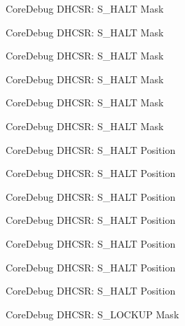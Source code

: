 \begin{DoxyRefList}
\label{deprecated__deprecated000118}%
%
Core\+Debug D\+H\+C\+SR\+: S\+\_\+\+H\+A\+LT Mask 

\label{deprecated__deprecated000172}%
%
Core\+Debug D\+H\+C\+SR\+: S\+\_\+\+H\+A\+LT Mask 

\label{deprecated__deprecated000257}%
%
Core\+Debug D\+H\+C\+SR\+: S\+\_\+\+H\+A\+LT Mask 

\label{deprecated__deprecated000314}%
%
Core\+Debug D\+H\+C\+SR\+: S\+\_\+\+H\+A\+LT Mask 

\label{deprecated__deprecated000390}%
%
Core\+Debug D\+H\+C\+SR\+: S\+\_\+\+H\+A\+LT Mask 

\label{deprecated__deprecated000477}%
%
Core\+Debug D\+H\+C\+SR\+: S\+\_\+\+H\+A\+LT Mask  
\item[Member \mbox{\hyperlink{group__CMSIS__CoreDebug_ga760a9a0d7f39951dc3f07d01f1f64772}{Core\+Debug\+\_\+\+D\+H\+C\+S\+R\+\_\+\+S\+\_\+\+H\+A\+L\+T\+\_\+\+Pos}} ]\label{deprecated__deprecated000025}%
%
Core\+Debug D\+H\+C\+SR\+: S\+\_\+\+H\+A\+LT Position 

\label{deprecated__deprecated000117}%
%
Core\+Debug D\+H\+C\+SR\+: S\+\_\+\+H\+A\+LT Position 

\label{deprecated__deprecated000171}%
%
Core\+Debug D\+H\+C\+SR\+: S\+\_\+\+H\+A\+LT Position 

\label{deprecated__deprecated000256}%
%
Core\+Debug D\+H\+C\+SR\+: S\+\_\+\+H\+A\+LT Position 

\label{deprecated__deprecated000313}%
%
Core\+Debug D\+H\+C\+SR\+: S\+\_\+\+H\+A\+LT Position 

\label{deprecated__deprecated000389}%
%
Core\+Debug D\+H\+C\+SR\+: S\+\_\+\+H\+A\+LT Position 

\label{deprecated__deprecated000476}%
%
Core\+Debug D\+H\+C\+SR\+: S\+\_\+\+H\+A\+LT Position  
\item[Member \mbox{\hyperlink{group__CMSIS__CoreDebug_ga7b67e4506d7f464ef5dafd6219739756}{Core\+Debug\+\_\+\+D\+H\+C\+S\+R\+\_\+\+S\+\_\+\+L\+O\+C\+K\+U\+P\+\_\+\+Msk}} ]\label{deprecated__deprecated000022}%
%
Core\+Debug D\+H\+C\+SR\+: S\+\_\+\+L\+O\+C\+K\+UP Mask 


\end{DoxyRefList}
